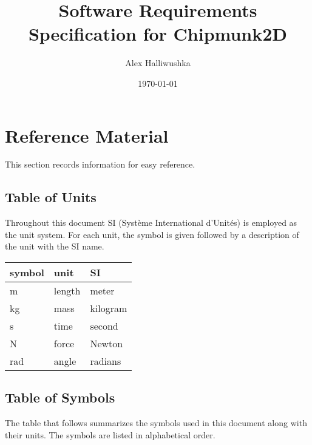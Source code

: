 \documentclass[12pt]{article}
\begin{document}
\title{Software Requirements Specification for Chipmunk2D} 
\author{Alex Halliwushka}
\date{\today}
	
\maketitle

\tableofcontents

%
%

\section{Reference Material}

This section records information for easy reference.


\subsection{Table of Units}

Throughout this document SI (Syst\`{e}me International d'Unit\'{e}s) is employed
as the unit system. For each unit, the symbol is given followed by a
description of the unit with the SI name.
~\newline

\renewcommand{\arraystretch}{1.2}

  \noindent \begin{tabular}{l l l} 
    \toprule		
    \textbf{symbol} & \textbf{unit} & \textbf{SI}\\
    \midrule 
    \si{\meter} & length & meter\\
    \si{\kilogram} & mass	& kilogram\\
    \si{\second} & time & second\\
    \si{\newton} & force & Newton\\
    \si{\radian} &   angle & radians\\
    \bottomrule
  \end{tabular}


\subsection{Table of Symbols}

The table that follows summarizes the symbols used in this document along with
their units. The symbols are listed in alphabetical order.
\end{document}
